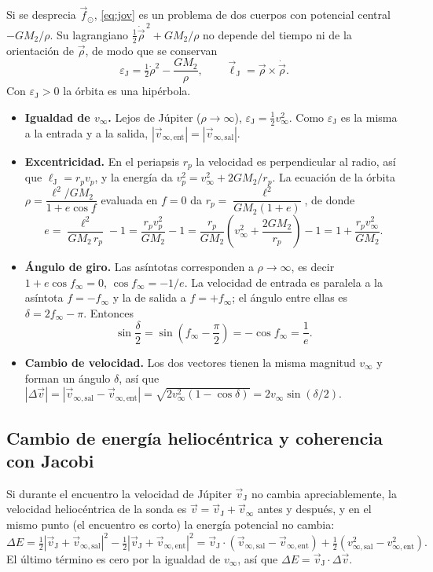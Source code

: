\documentclass[12pt,letterpaper]{article}
\begin{document}
Si se desprecia $\vec f_\odot$, \eqref{eq:jov} es un problema de dos cuerpos con potencial
central $-GM_2/\rho$. Su lagrangiano $\tfrac12\dot{\vec\rho}^{\,2} + GM_2/\rho$ no depende del tiempo
ni de la orientación de $\vec\rho$, de modo que se conservan
\[
\varepsilon_{\mathrm J} = \tfrac12\dot\rho^2 - \frac{GM_2}{\rho},
\qquad
\vec\ell_{\mathrm J} = \vec\rho\times\dot{\vec\rho}.
\]
Con $\varepsilon_{\mathrm J} > 0$ la órbita es una hipérbola.
\begin{itemize}
\item \textbf{Igualdad de $v_\infty$.} Lejos de Júpiter ($\rho\to\infty$),
$\varepsilon_{\mathrm J} = \tfrac12 v_\infty^2$. Como $\varepsilon_{\mathrm J}$ es la misma a la
entrada y a la salida, $|\vec v_{\infty,\mathrm{ent}}| = |\vec v_{\infty,\mathrm{sal}}|$.
\item \textbf{Excentricidad.} En el periapsis $r_p$ la velocidad es perpendicular al radio, así
que $\ell_{\mathrm J} = r_p v_p$, y la energía da $v_p^2 = v_\infty^2 + 2GM_2/r_p$. La ecuación de la
órbita $\rho = \dfrac{\ell^2/GM_2}{1+e\cos f}$ evaluada en $f = 0$ da
$r_p = \dfrac{\ell^2}{GM_2(1+e)}$, de donde
\[
e = \frac{\ell^2}{GM_2\, r_p} - 1 = \frac{r_p v_p^2}{GM_2} - 1
= \frac{r_p}{GM_2}\left(v_\infty^2 + \frac{2GM_2}{r_p}\right) - 1
= 1 + \frac{r_p v_\infty^2}{GM_2}.
\]
\item \textbf{Ángulo de giro.} Las asíntotas corresponden a $\rho\to\infty$, es decir
$1 + e\cos f_\infty = 0$, $\cos f_\infty = -1/e$. La velocidad de entrada es paralela a la
asíntota $f = -f_\infty$ y la de salida a $f = +f_\infty$; el ángulo entre ellas es
$\delta = 2f_\infty - \pi$. Entonces
\[
\sin\frac{\delta}{2} = \sin\left(f_\infty - \frac{\pi}{2}\right) = -\cos f_\infty = \frac1e .
\]
\item \textbf{Cambio de velocidad.} Los dos vectores tienen la misma magnitud $v_\infty$ y forman
un ángulo $\delta$, así que $|\Delta\vec v| = |\vec v_{\infty,\mathrm{sal}} - \vec v_{\infty,\mathrm{ent}}|
= \sqrt{2v_\infty^2(1-\cos\delta)} = 2v_\infty\sin(\delta/2)$.
\end{itemize}

\subsection{Cambio de energía heliocéntrica y coherencia con Jacobi}

Si durante el encuentro la velocidad de Júpiter $\vec v_{\mathrm J}$ no cambia
apreciablemente, la velocidad heliocéntrica de la sonda es $\vec v = \vec v_{\mathrm J} + \vec v_\infty$
antes y después, y en el mismo punto (el encuentro es corto) la energía potencial no cambia:
\[
\Delta E = \tfrac12|\vec v_{\mathrm J} + \vec v_{\infty,\mathrm{sal}}|^2 - \tfrac12|\vec v_{\mathrm J} + \vec v_{\infty,\mathrm{ent}}|^2
= \vec v_{\mathrm J}\cdot(\vec v_{\infty,\mathrm{sal}} - \vec v_{\infty,\mathrm{ent}})
+ \tfrac12\left(v_{\infty,\mathrm{sal}}^2 - v_{\infty,\mathrm{ent}}^2\right).
\]
El último término es cero por la igualdad de $v_\infty$, así que
$\Delta E = \vec v_{\mathrm J}\cdot\Delta\vec v$.
\end{document}
